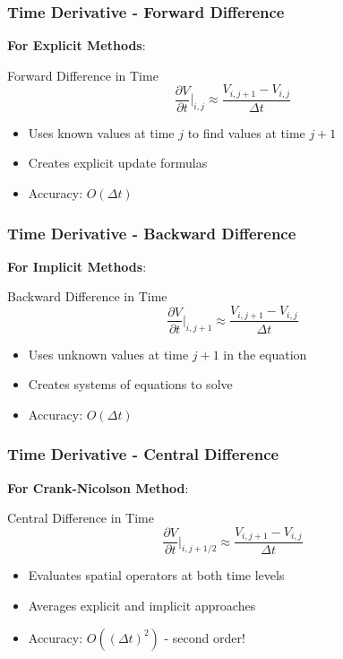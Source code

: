 \documentclass[aspectratio=169]{beamer}
\begin{document}
\begin{frame}
\frametitle{Time Derivative - Forward Difference}
\textbf{For Explicit Methods}:

\begin{block}{Forward Difference in Time}
\[\frac{\partial V}{\partial t} \bigg|_{i,j} \approx \frac{V_{i,j+1} - V_{i,j}}{\Delta t}\]
\end{block}

\begin{itemize}
\item Uses known values at time $j$ to find values at time $j+1$
\item Creates explicit update formulas
\item Accuracy: $O(\Delta t)$
\end{itemize}
\end{frame}

\begin{frame}
\frametitle{Time Derivative - Backward Difference}
\textbf{For Implicit Methods}:

\begin{block}{Backward Difference in Time}
\[\frac{\partial V}{\partial t} \bigg|_{i,j+1} \approx \frac{V_{i,j+1} - V_{i,j}}{\Delta t}\]
\end{block}

\begin{itemize}
\item Uses unknown values at time $j+1$ in the equation
\item Creates systems of equations to solve
\item Accuracy: $O(\Delta t)$
\end{itemize}
\end{frame}

\begin{frame}
\frametitle{Time Derivative - Central Difference}
\textbf{For Crank-Nicolson Method}:

\begin{block}{Central Difference in Time}
\[\frac{\partial V}{\partial t} \bigg|_{i,j+1/2} \approx \frac{V_{i,j+1} - V_{i,j}}{\Delta t}\]
\end{block}

\begin{itemize}
\item Evaluates spatial operators at both time levels
\item Averages explicit and implicit approaches
\item Accuracy: $O((\Delta t)^2)$ - second order!
\end{itemize}
\end{frame}
\end{document}
